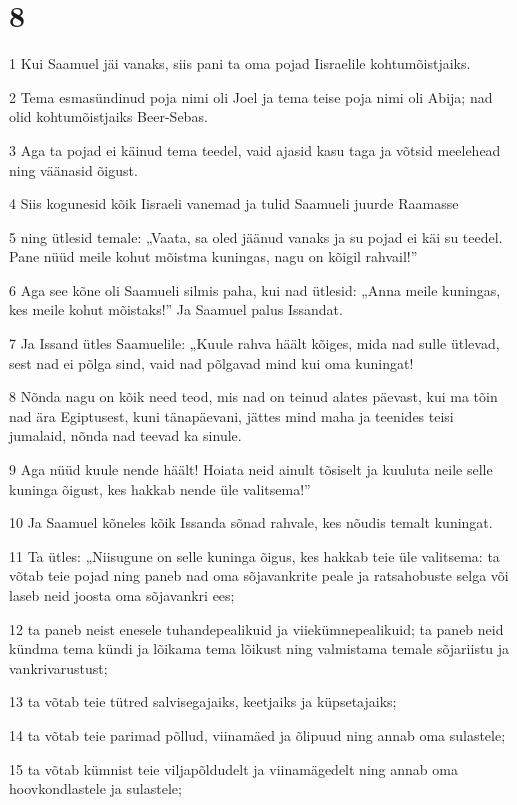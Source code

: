 \chapter{8}

\par 1 Kui Saamuel jäi vanaks, siis pani ta oma pojad Iisraelile kohtumõistjaiks.
\par 2 Tema esmasündinud poja nimi oli Joel ja tema teise poja nimi oli Abija; nad olid kohtumõistjaiks Beer-Sebas.
\par 3 Aga ta pojad ei käinud tema teedel, vaid ajasid kasu taga ja võtsid meelehead ning väänasid õigust.
\par 4 Siis kogunesid kõik Iisraeli vanemad ja tulid Saamueli juurde Raamasse
\par 5 ning ütlesid temale: „Vaata, sa oled jäänud vanaks ja su pojad ei käi su teedel. Pane nüüd meile kohut mõistma kuningas, nagu on kõigil rahvail!”
\par 6 Aga see kõne oli Saamueli silmis paha, kui nad ütlesid: „Anna meile kuningas, kes meile kohut mõistaks!” Ja Saamuel palus Issandat.
\par 7 Ja Issand ütles Saamuelile: „Kuule rahva häält kõiges, mida nad sulle ütlevad, sest nad ei põlga sind, vaid nad põlgavad mind kui oma kuningat!
\par 8 Nõnda nagu on kõik need teod, mis nad on teinud alates päevast, kui ma tõin nad ära Egiptusest, kuni tänapäevani, jättes mind maha ja teenides teisi jumalaid, nõnda nad teevad ka sinule.
\par 9 Aga nüüd kuule nende häält! Hoiata neid ainult tõsiselt ja kuuluta neile selle kuninga õigust, kes hakkab nende üle valitsema!”
\par 10 Ja Saamuel kõneles kõik Issanda sõnad rahvale, kes nõudis temalt kuningat.
\par 11 Ta ütles: „Niisugune on selle kuninga õigus, kes hakkab teie üle valitsema: ta võtab teie pojad ning paneb nad oma sõjavankrite peale ja ratsahobuste selga või laseb neid joosta oma sõjavankri ees;
\par 12 ta paneb neist enesele tuhandepealikuid ja viiekümnepealikuid; ta paneb neid kündma tema kündi ja lõikama tema lõikust ning valmistama temale sõjariistu ja vankrivarustust;
\par 13 ta võtab teie tütred salvisegajaiks, keetjaiks ja küpsetajaiks;
\par 14 ta võtab teie parimad põllud, viinamäed ja õlipuud ning annab oma sulastele;
\par 15 ta võtab kümnist teie viljapõldudelt ja viinamägedelt ning annab oma hoovkondlastele ja sulastele;
